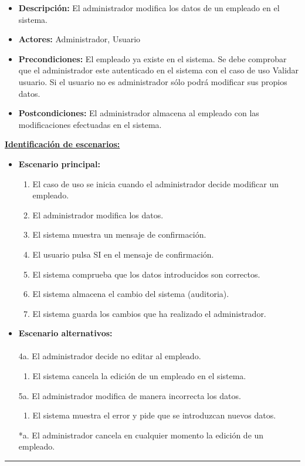\begin{itemize}\renewcommand{\labelitemi}{$\cdot$}
 \item \textbf{Descripción:} El administrador modifica los datos de un empleado en el sistema.
  \item \textbf{Actores:} Administrador, Usuario
  \item \textbf{Precondiciones:} El empleado ya existe en el sistema. Se debe comprobar que el administrador este autenticado en el sistema con el caso de uso Validar usuario. Si el usuario no es administrador sólo podrá modificar sus propios datos.
  \item \textbf{Postcondiciones:} El administrador almacena al empleado con las modificaciones efectuadas en el sistema.
\end{itemize}
\underline{\textbf{Identificación de escenarios:}}
\begin{itemize}\renewcommand{\labelitemi}{$\circ$}
 \item \textbf{Escenario principal:}
         \begin{enumerate}
          \item El caso de uso se inicia cuando el administrador decide modificar un empleado.
          \item El administrador modifica los datos.
  	  \item El sistema muestra un mensaje de confirmación.
          \item El usuario pulsa SI en el mensaje de confirmación.
          \item El sistema comprueba que los datos introducidos son correctos.
 	  \item El sistema almacena el cambio del sistema (auditoria).
          \item El sistema guarda los cambios que ha realizado el administrador.
         \end{enumerate}
  \item \textbf{Escenario alternativos:}\\\\
	   4a. El administrador decide no editar al empleado.
	      \begin{enumerate}
	       \item El sistema cancela la edición de un empleado en el sistema.
	      \end{enumerate}
           5a. El administrador modifica de manera incorrecta los datos.
		\begin{enumerate}
		 \item El sistema muestra el error y pide que se introduzcan nuevos datos.
		\end{enumerate}
          *a. El administrador cancela en cualquier momento la edición de un empleado.
\end{itemize}
\smallskip
\hrule height 1pt
\smallskip

